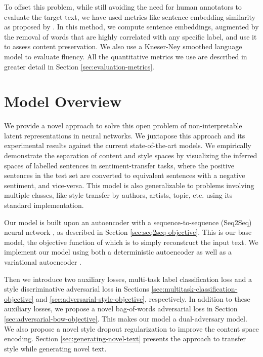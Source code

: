 To offset this problem, while still avoiding the need for human annotators to evaluate the target text, we have used metrics like sentence embedding similarity as proposed by \cite{fu2017style}. In this method, we compute sentence embeddings, augmented by the removal of words that are highly correlated with any specific label, and use it to assess content preservation. We also use a Kneser-Ney smoothed \citep{kneser1995improved} language model to evaluate fluency. All the quantitative metrics we use are described in greater detail in Section \ref{sec:evaluation-metrics}.


\section{Model Overview}

We provide a novel approach to solve this open problem of non-interpretable latent representations in neural networks. We juxtapose this approach and its experimental results against the current state-of-the-art models. We empirically demonstrate the separation of content and style spaces by visualizing the inferred spaces of labelled sentences in sentiment-transfer tasks, where the positive sentences in the test set are converted to equivalent sentences with a negative sentiment, and vice-versa. This model is also generalizable to problems involving multiple classes, like style transfer by authors, artists, topic, etc. using its standard implementation.

Our model is built upon an autoencoder with a sequence-to-sequence (Seq2Seq) neural network \citep{sutskever2014sequence}, as described in Section \ref{sec:seq2seq-objective}. This is our base model, the objective function of which is to simply reconstruct the input text. We implement our model using both a deterministic autoencoder \citep{baldi2012autoencoders} as well as a variational autoencoder \citep{kingma2013auto}.

Then we introduce two auxiliary losses, multi-task label classification loss and a style discriminative adversarial loss in Sections \ref{sec:multitask-classification-objective} and \ref{sec:adversarial-style-objective}, respectively. In addition to these auxiliary losses, we propose a novel bag-of-words adversarial loss in Section \ref{sec:adversarial-bow-objective}. This makes our model a dual-adversary model. We also propose a novel style dropout regularization to improve the content space encoding. Section \ref{sec:generating-novel-text} presents the approach to transfer style while generating novel text.

